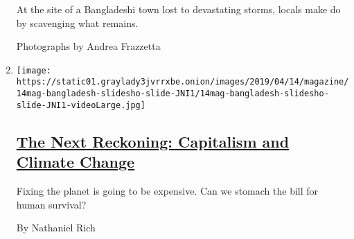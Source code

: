 \begin{enumerate}
  At the site of a Bangladeshi town lost to devastating storms, locals
  make do by scavenging what remains.

  Photographs by Andrea Frazzetta
\item
  \texttt{[image: https://static01.graylady3jvrrxbe.onion/images/2019/04/14/magazine/14mag-bangladesh-slidesho-slide-JNI1/14mag-bangladesh-slidesho-slide-JNI1-videoLarge.jpg]}

  \hypertarget{the-next-reckoning-capitalism-and-climate-change}{%
  \subsection{\texorpdfstring{\href{/interactive/2019/04/09/magazine/climate-change-capitalism.html}{The
  Next Reckoning: Capitalism and Climate
  Change}}{The Next Reckoning: Capitalism and Climate Change}}\label{the-next-reckoning-capitalism-and-climate-change}}

  Fixing the planet is going to be expensive. Can we stomach the bill
  for human survival?

  By Nathaniel Rich
\end{enumerate}


